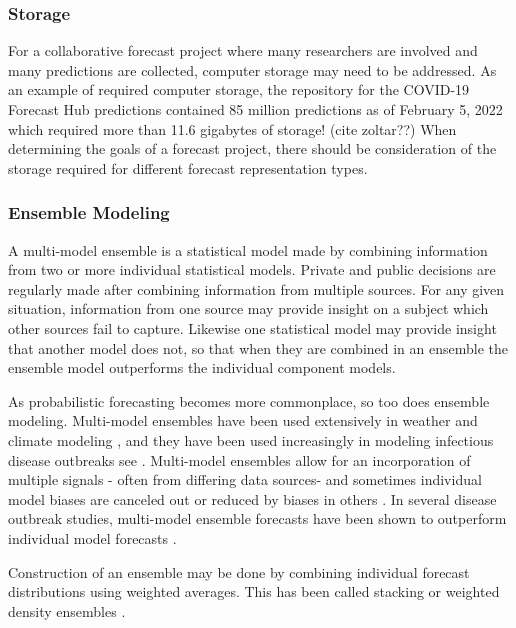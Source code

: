 \documentclass[11pt,notitlepage]{isuthesis}
\begin{document}
\subsubsection{Storage}
For a collaborative forecast project where many researchers are involved and 
many predictions are collected, computer storage may need to be addressed. 
As an example of required computer storage, the 
repository for the
COVID-19 Forecast Hub predictions contained 85 million predictions as of 
February 5, 2022 which required more than 11.6 gigabytes of storage!
(cite zoltar??)
When determining the goals of a forecast project, there should be consideration 
of the storage required for different forecast representation types.

\subsubsection{Ensemble Modeling}
A multi-model ensemble is a statistical model made by combining information from
two or more individual statistical models. Private and public decisions are 
regularly made after combining information from multiple sources. For any given
situation, information from one source may provide insight on a subject which 
other
sources fail to capture. Likewise one statistical model may provide insight
that another model does not, so that when they are combined in an ensemble the 
ensemble model outperforms the individual component models.

As probabilistic forecasting becomes more commonplace, so too does ensemble 
modeling. Multi-model ensembles have been used extensively in weather and
climate modeling \cite[for example]{baran2018combining}, 
and they have been used increasingly in modeling infectious disease outbreaks
see \cite[for example]{yamana2016superensemble}. 
Multi-model ensembles allow for an incorporation of multiple signals -
often from differing data sources- and sometimes individual model biases are 
canceled
out or reduced by biases in others \cite[see references
therein]{reich2019accuracy}. 
In several disease outbreak studies, multi-model ensemble forecasts have been 
shown to outperform individual model forecasts 
\cite[see
references therein]{cramer2021evaluation}.

Construction of an ensemble may be done by combining individual forecast 
distributions using weighted averages. This has been called stacking 
\cite{wolpert1992stacked} or weighted density ensembles 
\cite{ray2018prediction}. 
\end{document}
